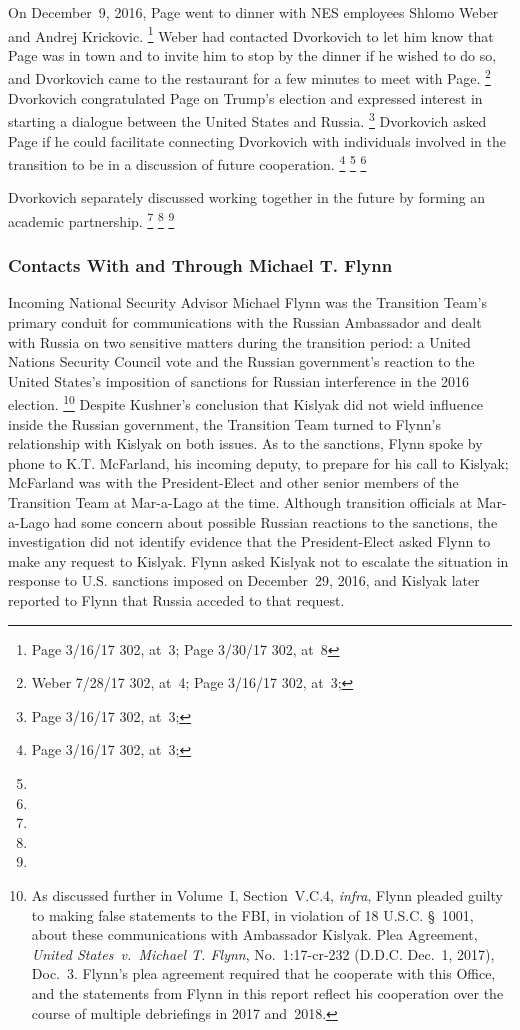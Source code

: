 On December~9, 2016, Page went to dinner with NES employees Shlomo Weber and Andrej Krickovic.%
\footnote{Page 3/16/17 302, at~3;
Page 3/30/17 302, at~8}
Weber had contacted Dvorkovich to let him know that Page was in town and to invite him to stop by the dinner if he wished to do so, and Dvorkovich came to the restaurant for a few minutes to meet with Page.%
\footnote{Weber 7/28/17 302, at~4;
Page 3/16/17 302, at~3;
}
Dvorkovich congratulated Page on Trump's election and expressed interest in starting a dialogue between the United States and Russia.%
\footnote{Page 3/16/17 302, at~3;
}
Dvorkovich asked Page if he could facilitate connecting Dvorkovich with individuals involved in the transition to be in a discussion of future cooperation.%
\footnote{Page 3/16/17 302, at~3;
}
\footnote{}
\footnote{}

Dvorkovich separately discussed working together in the future by forming an academic partnership.%
\footnote{}
\footnote{}
\footnote{}

\subsubsection{Contacts With and Through Michael T. Flynn}

Incoming National Security Advisor Michael Flynn was the Transition Team's primary conduit for communications with the Russian Ambassador and dealt with Russia on two sensitive matters during the transition period: a United Nations Security Council vote and the Russian government's reaction to the United States's imposition of sanctions for Russian interference in the 2016 election.%
\footnote{As discussed further in Volume~I, Section~V.C.4, \textit{infra}, Flynn pleaded guilty to making false statements to the FBI, in violation of 18 U.S.C. \S~1001, about these communications with Ambassador Kislyak.
Plea Agreement, \textit{United States~v.\ Michael T. Flynn}, No.~1:17-cr-232 (D.D.C. Dec.~1, 2017), Doc.~3.
Flynn's plea agreement required that he cooperate with this Office, and the statements from Flynn in this report reflect his cooperation over the course of multiple debriefings in 2017 and~2018.}
Despite Kushner's conclusion that Kislyak did not wield influence inside the Russian government, the Transition Team turned to Flynn's relationship with Kislyak on both issues.
As to the sanctions, Flynn spoke by phone to K.T. McFarland, his incoming deputy, to prepare for his call to Kislyak; McFarland was with the President-Elect and other senior members of the Transition Team at Mar-a-Lago at the time.
Although transition officials at Mar-a-Lago had some concern about possible Russian reactions to the sanctions, the investigation did not identify evidence that the President-Elect asked Flynn to make any request to Kislyak.
Flynn asked Kislyak not to escalate the situation in response to U.S. sanctions imposed on December~29, 2016, and Kislyak later reported to Flynn that Russia acceded to that request.

